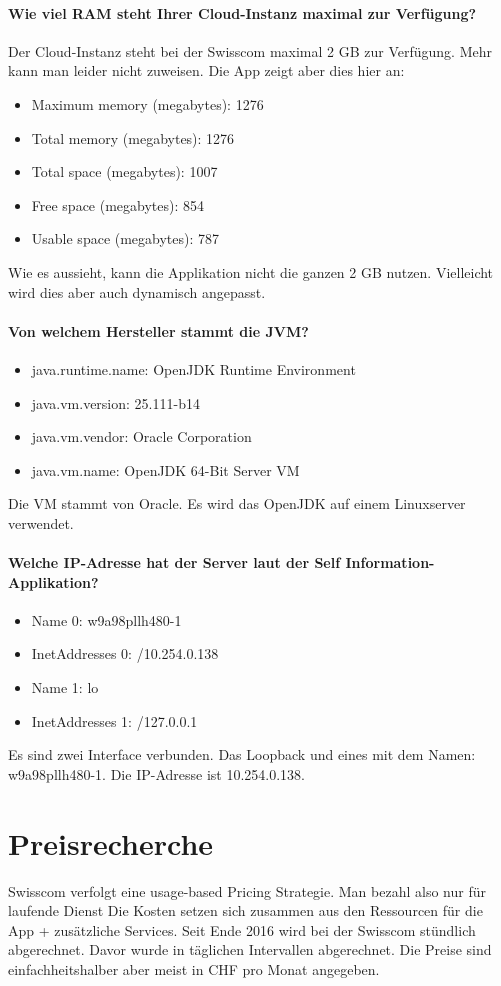 \subsubsection{Wie viel RAM steht Ihrer Cloud-Instanz maximal zur Verfügung?}
Der Cloud-Instanz steht bei der Swisscom maximal 2 GB zur Verfügung. Mehr kann man leider nicht zuweisen.
Die App zeigt aber dies hier an:
\begin{itemize}
\item		Maximum memory (megabytes): 1276
\item		Total memory (megabytes): 1276
\item		Total space (megabytes): 1007
\item		Free space (megabytes): 854
\item		Usable space (megabytes): 787
\end{itemize}
Wie es aussieht, kann die Applikation nicht die ganzen 2 GB nutzen. Vielleicht wird dies aber auch dynamisch angepasst.
\subsubsection{Von welchem Hersteller stammt die JVM?}
\begin{itemize}
\item		java.runtime.name: OpenJDK Runtime Environment
\item		java.vm.version: 25.111-b14
\item		java.vm.vendor: Oracle Corporation
\item		java.vm.name: OpenJDK 64-Bit Server VM
\end{itemize}
Die VM stammt von Oracle. Es wird das OpenJDK auf einem Linuxserver verwendet.
\subsubsection{Welche IP-Adresse hat der Server laut der Self Information-Applikation?}
\begin{itemize}
\item		Name 0: w9a98pllh480-1
\item		InetAddresses 0: /10.254.0.138
\item		Name 1: lo
\item		InetAddresses 1: /127.0.0.1
\end{itemize}
Es sind zwei Interface verbunden. Das Loopback und eines mit dem Namen: w9a98pllh480-1. Die IP-Adresse ist 10.254.0.138. 
\chapter{Preisrecherche}
Swisscom verfolgt eine usage-based Pricing Strategie. Man bezahl also nur für laufende Dienst Die Kosten setzen sich zusammen aus den Ressourcen für die App + zusätzliche Services. Seit Ende 2016 wird bei der Swisscom stündlich abgerechnet. Davor wurde in täglichen Intervallen abgerechnet. Die Preise sind einfachheitshalber aber meist in CHF pro Monat angegeben. 

